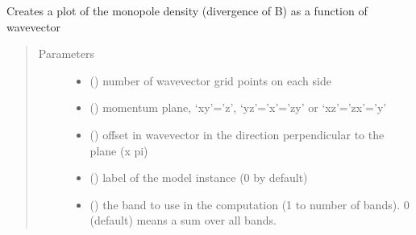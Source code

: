 \documentclass[letterpaper,10pt,english]{sphinxmanual}
\begin{document}
\begin{fulllineitems}
\label{\detokenize{berry:pyqcm.berry.monopole_map}}
\sphinxAtStartPar
Creates a plot of the monopole density (divergence of B) as a function of wavevector
\begin{quote}\begin{description}
\item[{Parameters}] \leavevmode\begin{itemize}
\item {} 
\sphinxAtStartPar
{} () \textendash{} number of wavevector grid points on each side

\item {} 
\sphinxAtStartPar
{} () \textendash{} momentum plane, ‘xy’=’z’, ‘yz’=’x’=’zy’ or ‘xz’=’zx’=’y’

\item {} 
\sphinxAtStartPar
{} () \textendash{} offset in wavevector in the direction perpendicular to the plane (x pi)

\item {} 
\sphinxAtStartPar
{} () \textendash{} label of the model instance (0 by default)

\item {} 
\sphinxAtStartPar
{} () \textendash{} the band to use in the computation (1 to number of bands). 0 (default) means a sum over all bands.


\end{itemize}
\end{description}
\end{quote}
\end{fulllineitems}
\end{document}
